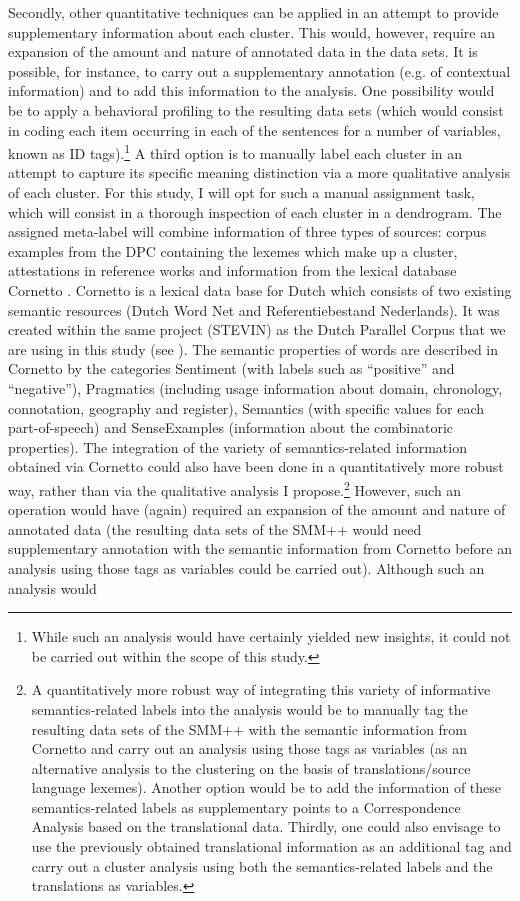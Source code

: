 Secondly, other quantitative techniques can be applied in an attempt to provide supplementary information about each cluster. This would, however, require an expansion of the amount and nature of annotated data in the data sets. It is possible, for instance, to carry out a supplementary annotation (e.g. of contextual information) and to add this information to the analysis. One possibility would be to apply a behavioral profiling \citep{divjak_ways_2006, divjak_clusters_2008, evans_behavioral_2009} to the resulting data sets (which would consist in coding each item occurring in each of the sentences for a number of variables, known as ID tags).\footnote{While such an analysis would have certainly yielded new insights, it could not be carried out within the scope of this study.} A third option is to manually label each cluster in an attempt to capture its specific meaning distinction via a more qualitative analysis of each cluster. For this study, I will opt for such a manual assignment task, which will consist in a thorough inspection of each cluster in a dendrogram. The assigned meta-label will combine information of three types of sources: corpus examples from the DPC containing the lexemes which make up a cluster, attestations in reference works and information from the lexical database Cornetto \citep{vossen_cornetto_2008, spyns_cornetto:_2013}. Cornetto is a lexical data base for Dutch which consists of two existing semantic resources (Dutch Word Net and Referentiebestand Nederlands). It was created within the same project (STEVIN) as the Dutch Parallel Corpus that we are using in this study (see ). The semantic properties of words are described in Cornetto by the categories Sentiment (with labels such as ``positive'' and ``negative''), Pragmatics (including usage information about domain, chronology, connotation, geography and register), Semantics (with specific values for each part-of-speech) and SenseExamples (information about the combinatoric properties). The integration of the variety of semantics-related information obtained via Cornetto could also have been done in a quantitatively more robust way, rather than via the qualitative analysis I propose.\footnote{A quantitatively more robust way of integrating this variety of informative semantics-related labels into the analysis would be to manually tag the resulting data sets of the SMM++ with the semantic information from Cornetto and carry out an analysis using those tags as variables (as an alternative analysis to the clustering on the basis of translations\slash source language lexemes). Another option would be to add the information of these semantics-related labels as supplementary points to a Correspondence Analysis based on the translational data. Thirdly, one could also envisage to use the previously obtained translational information as an additional tag and carry out a cluster analysis using both the semantics-related labels and the translations as variables.} However, such an operation would have (again) required an expansion of the amount and nature of annotated data (the resulting data sets of the SMM++ would need supplementary annotation with the semantic information from Cornetto before an analysis using those tags as variables could be carried out). Although such an analysis would 